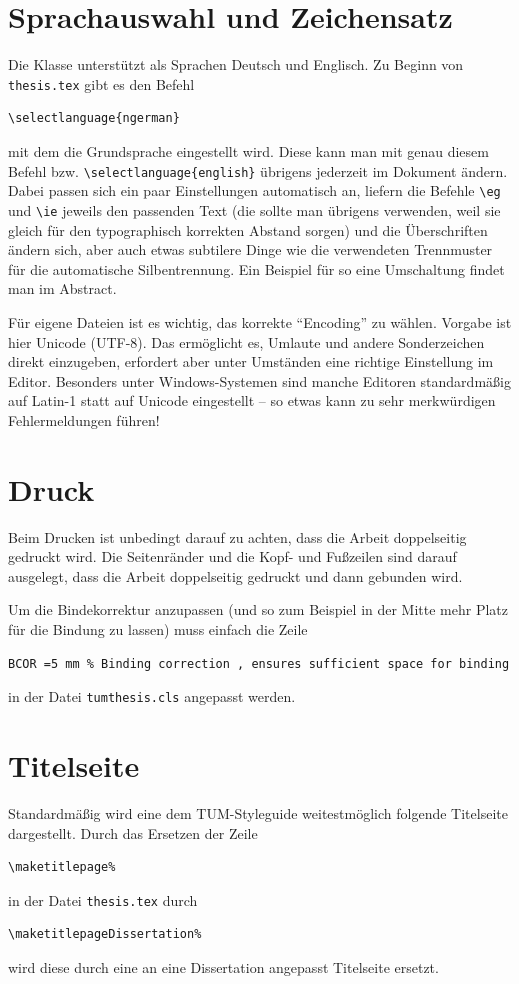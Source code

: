 \section{Sprachauswahl und Zeichensatz}
\label{sec:intro:sprachauswahl}
Die Klasse unterstützt als Sprachen Deutsch und Englisch. Zu Beginn von
\texttt{thesis.tex} gibt es den Befehl
\begin{lstlisting}[language={[LaTeX]TeX}]
  \selectlanguage{ngerman}
\end{lstlisting}
mit dem die Grundsprache eingestellt wird. Diese kann man mit genau diesem
Befehl bzw. \verb|\selectlanguage{english}| übrigens jederzeit im Dokument
ändern. Dabei passen sich ein paar Einstellungen automatisch an, \eg liefern die
Befehle \verb|\eg| und \verb|\ie| jeweils den passenden Text (die sollte man
übrigens verwenden, weil sie gleich für den typographisch korrekten Abstand
sorgen) und die Überschriften ändern sich, aber auch etwas subtilere Dinge wie
die verwendeten Trennmuster für die automatische Silbentrennung. Ein Beispiel
für so eine Umschaltung findet man im Abstract.

Für eigene Dateien ist es wichtig, das korrekte \enquote{Encoding} zu
wählen. Vorgabe ist hier Unicode (UTF-8). Das ermöglicht es, Umlaute und andere
Sonderzeichen direkt einzugeben, erfordert aber unter Umständen eine richtige
Einstellung im Editor. Besonders unter Windows-Systemen sind manche Editoren
standardmäßig auf Latin-1 statt auf Unicode eingestellt -- so etwas kann zu sehr
merkwürdigen Fehlermeldungen führen!

\section{Druck}
\label{sec:intro:bindung}
Beim Drucken ist unbedingt darauf zu achten, dass die Arbeit doppelseitig
gedruckt wird. Die Seitenränder und die Kopf- und Fußzeilen sind darauf
ausgelegt, dass die Arbeit doppelseitig gedruckt und dann gebunden wird.

Um die Bindekorrektur anzupassen (und so zum Beispiel in der Mitte mehr Platz für die Bindung zu lassen) muss einfach die Zeile 
\begin{lstlisting}[language={[LaTeX]TeX}]
  BCOR =5 mm % Binding correction , ensures sufficient space for binding
\end{lstlisting}
in der Datei \verb|tumthesis.cls| angepasst werden.

\section{Titelseite}
Standardmäßig wird eine dem TUM-Styleguide weitestmöglich folgende Titelseite dargestellt. Durch das Ersetzen der Zeile
\begin{verbatim}
\maketitlepage%
\end{verbatim}
in der Datei \texttt{thesis.tex} durch
\begin{verbatim}
\maketitlepageDissertation%
\end{verbatim}
wird diese durch eine an eine Dissertation angepasst Titelseite ersetzt.

